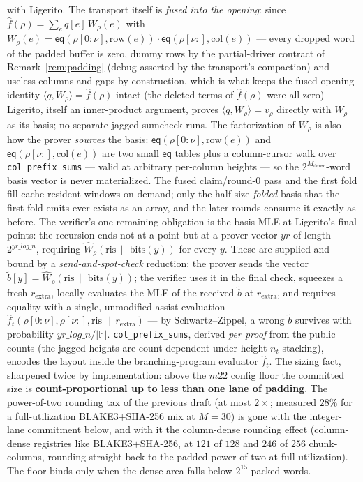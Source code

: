 \documentclass[11pt]{article}
\newcommand{\F}{\mathbb{F}}                       %
\newcommand{\eq}{\mathsf{eq}}
\newcommand{\ip}[2]{\langle #1, #2 \rangle}
\newcommand{\code}[1]{\texttt{#1}}
\theoremstyle{definition}
\begin{document}
with Ligerito. The transport itself is
\emph{fused into the opening}: since $\hat f(\rho) = \sum_e q[e]\,
W_\rho(e)$ with $W_\rho(e) = \eq(\rho[0{:}\nu], \mathrm{row}(e))\cdot
\eq(\rho[\nu{:}], \mathrm{col}(e))$ --- every dropped word of the padded
buffer is zero, dummy rows by the partial-driver contract of
Remark~\ref{rem:padding} (debug-asserted by the transport's compaction)
and useless columns and gaps by construction, which is what keeps the
fused-opening identity $\ip{q}{W_\rho} = \hat f(\rho)$ intact (the
deleted terms of $\hat f(\rho)$ were all zero) --- Ligerito, itself an
inner-product argument, proves $\langle q, W_\rho\rangle = v_\rho$
directly with $W_\rho$ as its basis; no separate jagged sumcheck runs.
The factorization of $W_\rho$ is also how the prover \emph{sources} the
basis: $\eq(\rho[0{:}\nu], \mathrm{row}(e))$ and
$\eq(\rho[\nu{:}], \mathrm{col}(e))$ are two small $\eq$ tables plus a
column-cursor walk over \code{col\_prefix\_sums} --- valid at arbitrary
per-column heights --- so the $2^{M_{\mathrm{dense}}}$-word basis
vector is never materialized. The fused claim/round-0 pass and the
first fold fill cache-resident windows on demand; only the half-size
\emph{folded} basis that the first fold emits ever exists as an array,
and the later rounds consume it exactly as before.
The verifier's one remaining obligation is the basis MLE at Ligerito's
final points: the recursion ends not at a point but at a prover vector
$yr$ of length $2^{yr\_log\_n}$, requiring
$\hat W_\rho(\mathrm{ris}\,\|\,\mathrm{bits}(y))$ for every $y$. These
are supplied and bound by a \emph{send-and-spot-check} reduction: the
prover sends the vector
$\tilde b[y] = \hat W_\rho(\mathrm{ris}\,\|\,\mathrm{bits}(y))$; the
verifier uses it in the final check, squeezes a fresh
$r_{\mathrm{extra}}$, locally evaluates the MLE of the received
$\tilde b$ at $r_{\mathrm{extra}}$, and requires equality with a
single, unmodified assist evaluation
$\hat f_t(\rho[0{:}\nu], \rho[\nu{:}], \mathrm{ris}\,\|\,r_{\mathrm{extra}})$
--- by Schwartz--Zippel, a wrong $\tilde b$ survives with probability
$yr\_log\_n/|\F|$. \code{col\_prefix\_sums}, derived \emph{per proof}
from the public counts (the jagged heights are count-dependent under
height-$n_t$ stacking), encodes the layout inside the branching-program
evaluator $\hat f_t$.
The sizing fact, sharpened twice by implementation: above the $m22$
config floor the committed size is \textbf{count-proportional up to
less than one lane of padding}. The power-of-two rounding tax of the
previous draft (at most $2\times$; measured $28\%$ for a
full-utilization BLAKE3$+$SHA-256 mix at $M = 30$) is gone with the
integer-lane commitment below, and with it the column-dense rounding
effect (column-dense registries like BLAKE3$+$SHA-256, at $121$ of
$128$ and $246$ of $256$ chunk-columns, rounding straight back to the
padded power of two at full utilization). The floor binds only when the
dense area falls below $2^{15}$ packed words.
\end{document}
